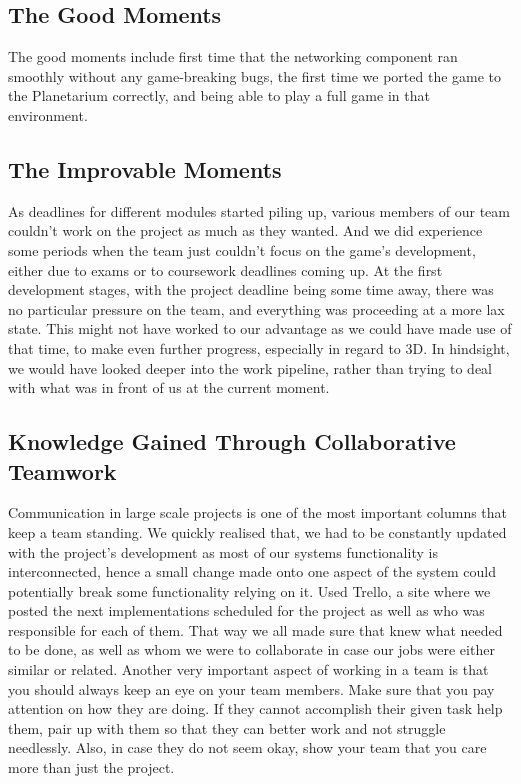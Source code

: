 \documentclass[11pt,a4paper]{article}
\begin{document}
         
 \subsection{The Good Moments}
        The good moments include first time that the networking component ran smoothly without any game-breaking bugs, the first time we ported the game to the Planetarium correctly, and being able to play a full game in that environment.

        \subsection{The Improvable Moments}
        As deadlines for different modules started piling up, various members of our team couldn't work on the project as much as they wanted. And we did experience some periods when the team just couldn't focus on the game's development, either due to exams or to coursework deadlines coming up.
        At the first development stages, with the project deadline being some time away, there was no particular pressure on the team, and everything was proceeding at a more lax state. This might not have worked to our advantage as we could have made use of that time, to make even further progress, especially in regard to 3D. In hindsight, we would have looked deeper into the work pipeline, rather than trying to deal with what was in front of us at the current moment.  


        \subsection{Knowledge Gained Through Collaborative Teamwork}
        Communication in large scale projects is one of the most important columns that keep a team standing. We quickly realised that, we had to be constantly updated with the project's development as most of our systems functionality is interconnected, hence a small change made onto one aspect of the system could potentially break some functionality relying on it. 
        Used Trello, a site where we posted the next implementations scheduled for the project as well as who was responsible for each of them. That way we all made sure that knew what needed to be done, as well as whom we were to collaborate in case our jobs were either similar or related.
        Another very important aspect of working in a team is that you should always keep an eye on your team members. Make sure that you pay attention on how they are doing. If they cannot accomplish their given task help them, pair up with them so that they can better work and not struggle needlessly. Also, in case they do not seem okay, show your team that you care more than just the project.
         
\end{document}
